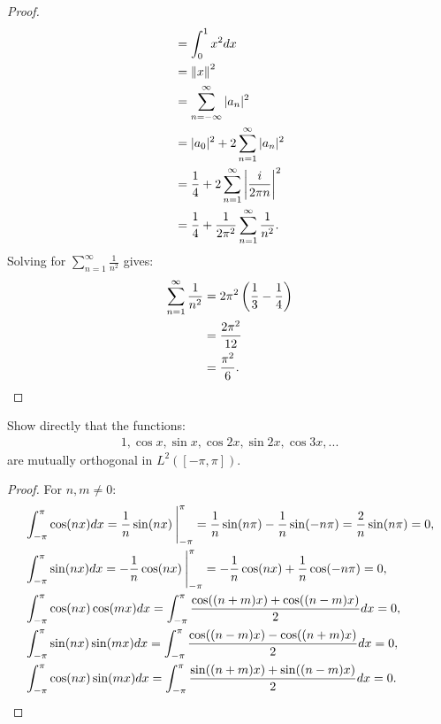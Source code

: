 \documentclass[10pt,oneside,openany]{memoir}
\begin{document}
\begin{proof}
\begin{equation*}
\begin{split}
                & = \int_0^1 x^2 dx \\
                & = \lnorm x \rnorm^2 \\
                & = \sum_{n = -\infty}^\infty |a_n|^2 \\
                & =|a_0|^2 + 2 \sum_{n = 1}^\infty |a_n|^2 \\
                & = \frac{1}{4} + 2 \sum_{n = 1}^\infty \left| \frac{i}{2 \pi n} \right|^2 \\
                & = \frac{1}{4} + \frac{1}{2\pi^2}\sum_{n = 1}^\infty \frac{1}{n^2}.
            \end{split}
            \end{equation*}
        Solving for $\sum_{n = 1}^\infty \frac{1}{n^2}$ gives:
            \begin{equation*}
            \begin{split}
                \sum_{n = 1}^\infty \frac{1}{n^2}
                & = 2\pi^2 \left( \frac{1}{3} - \frac{1}{4} \right) \\
                & = \frac{2\pi^2}{12} \\
                & = \frac{\pi^2}{6}. \qedhere
            \end{split}
            \end{equation*}
    \end{proof}

\begin{exercise}
Show directly that the functions:
    \begin{equation*}
    \begin{split}
        1, \cos x, \sin x, \cos 2x, \sin 2x, \cos 3x, ...
    \end{split}
    \end{equation*}
are mutually orthogonal in $L^2([-\pi,\pi])$.
\end{exercise}
\begin{proof}
    For $n,m \neq 0$:
        \begin{equation*}
        \begin{split}
            &\int_{-\pi}^{\pi}\cos (nx) dx = \frac{1}{n}\sin(nx)\h2\Bigg|_{-\pi}^{\pi} = \frac{1}{n}\sin(n \pi) - \frac{1}{n}\sin(-n\pi) = \frac{2}{n}\sin(n \pi) = 0,\\
            &\int_{-\pi}^{\pi}\sin (nx) dx = -\frac{1}{n}\cos(nx) \h2\Bigg|_{-\pi}^{\pi} = -\frac{1}{n}\cos(nx) + \frac{1}{n}\cos(-n\pi) = 0,\\
            &\int_{-\pi}^{\pi}\cos (nx) \cos (mx) dx = \int_{-\pi}^\pi \frac{\cos((n+m)x) + \cos((n-m)x)}{2}dx = 0,\\
            &\int_{-\pi}^{\pi}\sin (nx) \sin (mx) dx = \int_{-\pi}^\pi \frac{\cos((n-m)x) - \cos((n+m)x)}{2}dx = 0,\\
            &\int_{-\pi}^{\pi}\cos (nx) \sin (mx) dx= \int_{-\pi}^\pi \frac{\sin((n+m)x) + \sin((n - m)x)}{2}dx = 0. \qedhere
        \end{split}
        \end{equation*}
\end{proof}
\end{document}
